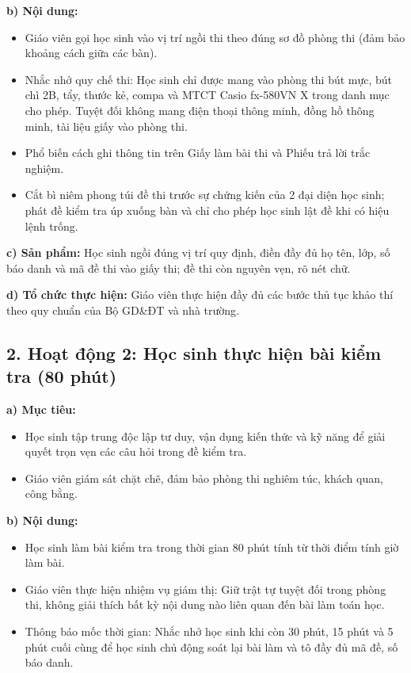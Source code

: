 \documentclass[12pt, a4paper]{article}
\begin{document}
\noindent \textbf{b) Nội dung:}
\begin{itemize}[leftmargin=0.6cm]
    \item Giáo viên gọi học sinh vào vị trí ngồi thi theo đúng sơ đồ phòng thi (đảm bảo khoảng cách giữa các bàn).
    \item Nhắc nhở quy chế thi: Học sinh chỉ được mang vào phòng thi bút mực, bút chì 2B, tẩy, thước kẻ, compa và MTCT Casio fx-580VN X trong danh mục cho phép. Tuyệt đối không mang điện thoại thông minh, đồng hồ thông minh, tài liệu giấy vào phòng thi.
    \item Phổ biến cách ghi thông tin trên Giấy làm bài thi và Phiếu trả lời trắc nghiệm.
    \item Cắt bì niêm phong túi đề thi trước sự chứng kiến của 2 đại diện học sinh; phát đề kiểm tra úp xuống bàn và chỉ cho phép học sinh lật đề khi có hiệu lệnh trống.
\end{itemize}

\noindent \textbf{c) Sản phẩm:}
Học sinh ngồi đúng vị trí quy định, điền đầy đủ họ tên, lớp, số báo danh và mã đề thi vào giấy thi; đề thi còn nguyên vẹn, rõ nét chữ.

\noindent \textbf{d) Tổ chức thực hiện:}
Giáo viên thực hiện đầy đủ các bước thủ tục khảo thí theo quy chuẩn của Bộ GD\&ĐT và nhà trường.

\subsection*{2. Hoạt động 2: Học sinh thực hiện bài kiểm tra (80 phút)}

\noindent \textbf{a) Mục tiêu:}
\begin{itemize}[leftmargin=0.6cm]
    \item Học sinh tập trung độc lập tư duy, vận dụng kiến thức và kỹ năng để giải quyết trọn vẹn các câu hỏi trong đề kiểm tra.
    \item Giáo viên giám sát chặt chẽ, đảm bảo phòng thi nghiêm túc, khách quan, công bằng.
\end{itemize}

\noindent \textbf{b) Nội dung:}
\begin{itemize}[leftmargin=0.6cm]
    \item Học sinh làm bài kiểm tra trong thời gian 80 phút tính từ thời điểm tính giờ làm bài.
    \item Giáo viên thực hiện nhiệm vụ giám thị: Giữ trật tự tuyệt đối trong phòng thi, không giải thích bất kỳ nội dung nào liên quan đến bài làm toán học.
    \item Thông báo mốc thời gian: Nhắc nhở học sinh khi còn 30 phút, 15 phút và 5 phút cuối cùng để học sinh chủ động soát lại bài làm và tô đầy đủ mã đề, số báo danh.
\end{itemize}
\end{document}
